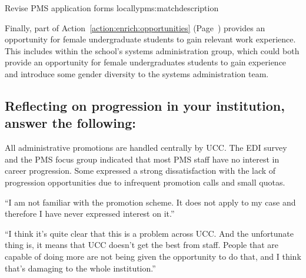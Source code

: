 \begin{actionblock}{\ksspace{}Revise PMS application forms locally}{pms:matchdescription}
\actreviewadvertisements
\hfill{
    \hypersetup{hidelinks}
    \hyperlink{d3}{\gotoactionsymbol{}}
}
\end{actionblock}


Finally, part of Action~\ref{action:enrich:opportunities} (Page~\pageref{action:enrich:opportunities}) provides an opportunity for female undergraduate students to gain relevant work experience. This includes within the school's systems administration group, which could both provide an opportunity for female undergraduates students to gain experience and introduce some gender diversity to the systems administration team. 


\subsection{Reflecting on progression in your institution, answer the following:}

All administrative promotions are handled centrally by UCC.
The EDI survey and the PMS focus group indicated that most PMS staff have no interest in career progression. Some expressed a strong dissatisfaction with the lack of progression opportunities due to infrequent promotion calls and small quotas.  

\begin{myquote}
   ``I am not familiar with the promotion scheme. It does not apply to my case and therefore I have never expressed interest on it.'' 
\end{myquote}

\begin{myquote}
   ``I think it's quite clear that this is a problem across UCC. And the unfortunate thing is, it means that UCC doesn't get the best from staff.   People that are capable of doing more are not being given the opportunity to do that, and I think that's damaging to the whole institution.''
\end{myquote}



